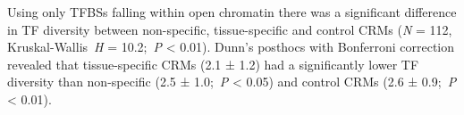 \documentclass[../main.tex]{subfiles}
\begin{document}
{{%
Using only TFBSs falling within open chromatin there was a significant difference in TF diversity between non\hyp{}specific, tissue\hyp{}specific and control CRMs (\textit{N} = 112, Kruskal\hyp{}Wallis~\textit{H} = 10.2;~\textit{P} \textless{} 0.01).
Dunn's posthocs with Bonferroni correction revealed that tissue\hyp{}specific CRMs (2.1 ± 1.2) had a significantly lower TF diversity than non\hyp{}specific (2.5 ± 1.0;~\textit{P} \textless{} 0.05) and control CRMs (2.6 ± 0.9;~\textit{P} \textless{} 0.01).


}}
\end{document}
